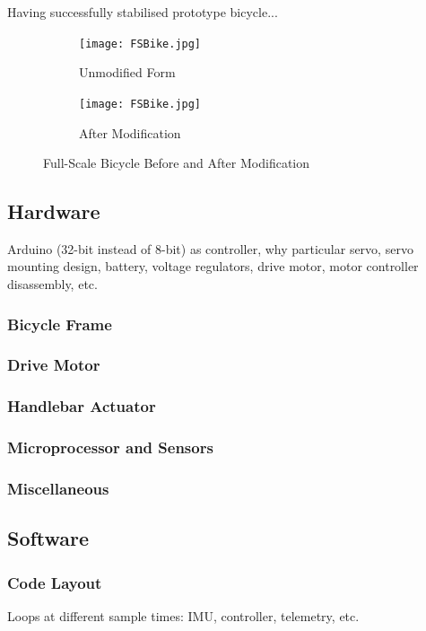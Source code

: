 Having successfully stabilised prototype bicycle...

\begin{figure}[H]
	\begin{subfigure}{0.5\textwidth}
	\texttt{[image: FSBike.jpg]}
	\caption{Unmodified Form}
	\end{subfigure} \hspace{1mm}
	\begin{subfigure}{0.5\textwidth}
	\texttt{[image: FSBike.jpg]}
	\caption{After Modification}
	\end{subfigure}
	\caption{Full-Scale Bicycle Before and After Modification}
\end{figure}

\subsection{Hardware}

Arduino (32-bit instead of 8-bit) as controller, why particular servo, servo mounting design, battery, voltage regulators, drive motor, motor controller disassembly, etc. 

\subsubsection{Bicycle Frame}

\subsubsection{Drive Motor}

\subsubsection{Handlebar Actuator}

\subsubsection{Microprocessor and Sensors}

\subsubsection{Miscellaneous}

\subsection{Software}

\subsubsection{Code Layout}
Loops at different sample times: IMU, controller, telemetry, etc.

